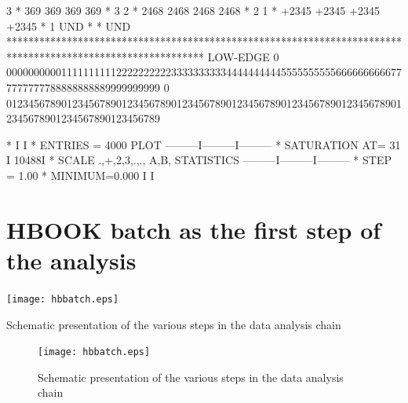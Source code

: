 \begin{Listing}
     3      *   369                      369                      369                      369                         *   3
     2      *   2468                     2468                     2468                     2468                        *   2
     1      *   +2345                    +2345                    +2345                    +2345                       *   1
   UND      *                                                                                                          * UND
            ************************************************************************************************************
 LOW-EDGE   0   0000000000111111111122222222223333333333444444444455555555556666666666777777777788888888889999999999
            0   0123456789012345678901234567890123456789012345678901234567890123456789012345678901234567890123456789
 
  *                                                          I         I
  * ENTRIES =     4000                   PLOT       ---------I---------I---------
  * SATURATION  AT=           31                             I    10488I
  * SCALE  .,+,2,3,.,., A,B,           STATISTICS   ---------I---------I---------
  * STEP = 1.00     * MINIMUM=0.000                          I         I
\end{Listing}

\finalnewpage%

\section{HBOOK batch as the first step of the analysis}

\begin{Fighere}
\centering\texttt{[image: hbbatch.eps]}
\caption{Schematic presentation of the various steps in the data analysis chain}
\label{FBATCH}
\end{Fighere}
\begin{htmlonly}
\begin{figure}
\begin{makeimage}
\texttt{[image: hbbatch.eps]}
\end{makeimage}
\caption{Schematic presentation of the various steps in the data analysis chain}
\label{FBATCH}
\end{figure}
\end{htmlonly}

